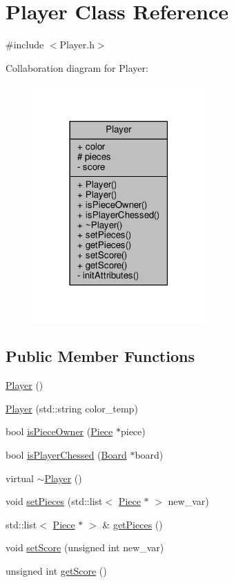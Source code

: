 \hypertarget{class_player}{}\section{Player Class Reference}
\label{class_player}


{\ttfamily \#include $<$Player.\+h$>$}



Collaboration diagram for Player\+:\nopagebreak
\begin{figure}[H]
\begin{center}
\leavevmode
\includegraphics[width=186pt]{class_player__coll__graph}
\end{center}
\end{figure}
\subsection*{Public Member Functions}
\begin{DoxyCompactItemize}
\item 
\hyperlink{class_player_affe0cc3cb714f6deb4e62f0c0d3f1fd8}{Player} ()
\item 
\hyperlink{class_player_a355464bd2331faa49dfcc259174ac0ee}{Player} (std\+::string color\+\_\+temp)
\item 
bool \hyperlink{class_player_acd154fbc75679e8bd21ae790836c8623}{is\+Piece\+Owner} (\hyperlink{class_piece}{Piece} $\ast$piece)
\item 
bool \hyperlink{class_player_ab792f06e8da9ce878b2de013fb04b103}{is\+Player\+Chessed} (\hyperlink{class_board}{Board} $\ast$board)
\item 
virtual \hyperlink{class_player_a749d2c00e1fe0f5c2746f7505a58c062}{$\sim$\+Player} ()
\item 
void \hyperlink{class_player_a31d381a29c010c26d69a4cfd30c37049}{set\+Pieces} (std\+::list$<$ \hyperlink{class_piece}{Piece} $\ast$ $>$ new\+\_\+var)
\item 
std\+::list$<$ \hyperlink{class_piece}{Piece} $\ast$ $>$ \& \hyperlink{class_player_a479c15c00634b36e3391443afe5b9b80}{get\+Pieces} ()
\item 
void \hyperlink{class_player_ae02f0030bc93cd08c014dd48943c0304}{set\+Score} (unsigned int new\+\_\+var)
\item 
unsigned int \hyperlink{class_player_a0a4b4a42bca1b1d62be928ce234d8df5}{get\+Score} ()
\end{DoxyCompactItemize}

